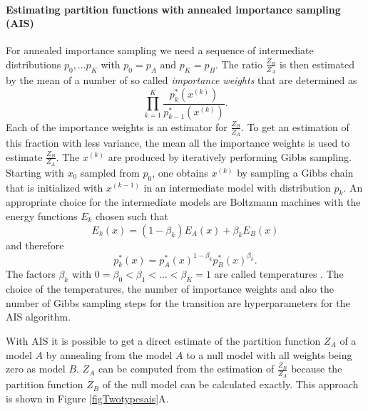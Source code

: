 \documentclass[12pt]{article}
\begin{document}
\paragraph{Estimating partition functions with annealed importance sampling (AIS)}\label{methodAIS}

For annealed importance sampling we need a sequence of intermediate distributions
$p_0, \dots p_K$ with
$p_0 = p_A$ and $p_K = p_B$. The ratio $\frac{Z_B}{Z_A}$ is then estimated by the mean of a number of so called {\em importance weights} that are determined as
\[
   \prod_{k=1}^K \frac{p^*_k(x^{(k)})}{p^*_{k-1}(x^{(k)})}.
\]
Each of the importance weights is an estimator for $\frac{Z_B}{Z_A}$.
To get an estimation of this fraction with less variance, the mean all the importance weights is used to estimate  $\frac{Z_B}{Z_A}$.
The $x^{(k)}$ are produced by iteratively performing Gibbs sampling. Starting with $x_0$ sampled from $p_0$, one obtains $x^{(k)}$ by sampling a Gibbs chain that is initialized with $x^{(k-1)}$ in an intermediate model with distribution $p_k$. An appropriate choice for the intermediate models are Boltzmann machines with the energy functions $E_k$ chosen such that
\[
   E_k(x) = (1 - \beta_k) E_A(x) + \beta_k E_B(x)
\]
and therefore
\[
   p_k^*(x) = p_A^*(x)^{1-\beta_k} p_B^*(x)^{\beta_k}.
\]
The factors $\beta_k$ with $0 = \beta_0 < \beta_1 < ... < \beta_K = 1$ are called temperatures \citep{salakhutdinov2008learning}.
The choice of the temperatures, the number of importance weights and also the number of Gibbs sampling steps for the transition are hyperparameters for the AIS algorithm.

With AIS it is possible to get a direct estimate of the partition function $Z_A$ of a model $A$ by annealing from the model $A$ to a null model with all weights being zero as model $B$.
$Z_A$ can be computed from the estimation of $\frac{Z_B}{Z_A}$ because the partition function $Z_B$ of the null model can be calculated exactly. This approach is shown in Figure \ref{figTwotypesais}A.
\end{document}
